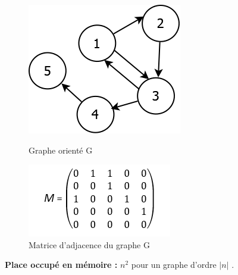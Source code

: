 \begin{figure}[H]
	\begin{minipage}[c]{.46\linewidth}
	\begin{center}
		\includegraphics[height=100 pt, width=110 pt]{./ressources/image/graphAdjace.png} 
		\caption{Graphe orienté G}
		\label{grapAdjac}
	\end{center}
	\end{minipage} 
	\begin{minipage}[c]{.46\linewidth}
	\begin{center}
		\includegraphics[height=110 pt, width=140 pt]{./ressources/image/matriceAdjac.png} 
		\caption{Matrice d'adjacence du graphe G}
		\label{matriceAdjac}
	\end{center}
	\end{minipage} 
\end{figure} 

\textbf{Place occupé en mémoire :} ${n}^{2}$ pour un graphe d'ordre $|n|$ \citep{lopez2003cours}.			
